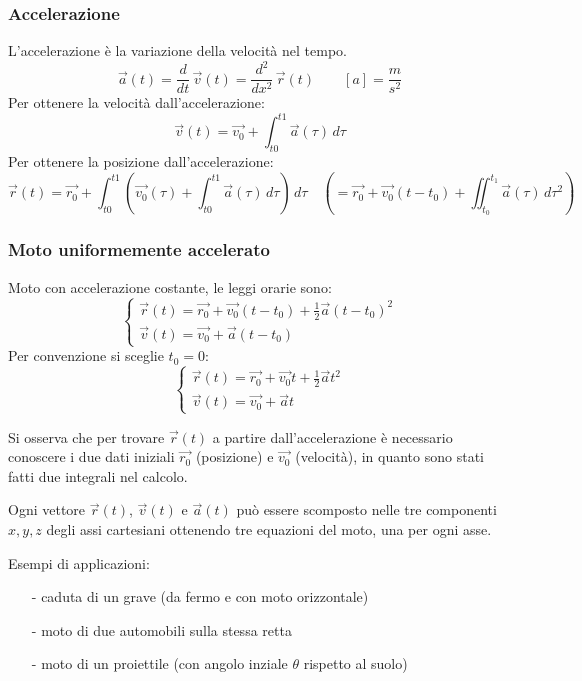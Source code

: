 \documentclass[a4paper]{article}
\newcommand\dt{\frac{d}{dt}\,}
\begin{document}
\subsubsection*{Accelerazione}
L'accelerazione è la variazione della velocità nel tempo. \[\vec{a}(t) = \dt \vec{v}(t) = \frac{d^2}{dx^2} \, \vec{r}(t) \qquad \left[a\right] = \frac{m}{s^2}\]
Per ottenere la velocità dall'accelerazione: \[\vec{v}(t) = \vec{v_0} + \int_{t0}^{t1} \vec{a}(\tau) \, d\tau\]
Per ottenere la posizione dall'accelerazione: \[\vec{r}(t) = \vec{r_0} + \int_{t0}^{t1} \left( \vec{v_0}(\tau) + \int_{t0}^{t1} \vec{a}(\tau) \, d\tau \right) \, d\tau \quad \left(= \vec{r_0} + \vec{v_0}(t-t_0) + \iint_{t_0}^{t_1} \vec{a}(\tau) \, d\tau^2 \right)\]

\subsubsection*{Moto uniformemente accelerato}
Moto con accelerazione costante, le leggi orarie sono:
\[ \begin{cases}
	\vec{r}(t) = \vec{r_0} + \vec{v_0}(t-t_0) + \frac{1}{2}\vec{a}(t-t_0)^2 \\
	\vec{v}(t) = \vec{v_0} + \vec{a}(t-t_0)
\end{cases} \]
Per convenzione si sceglie \(t_0 = 0\):
\[ \begin{cases}
	\vec{r}(t) = \vec{r_0} + \vec{v_0}t + \frac{1}{2}\vec{a}t^2 \\
	\vec{v}(t) = \vec{v_0} + \vec{a}t
\end{cases} \]

Si osserva che per trovare \(\vec{r}(t)\) a partire dall'accelerazione è necessario conoscere i due dati iniziali \(\vec{r_0}\)
(posizione) e \(\vec{v_0}\) (velocità), in quanto sono stati fatti due integrali nel calcolo.

Ogni vettore \(\vec{r}(t)\), \(\vec{v}(t)\) e \(\vec{a}(t)\) può essere scomposto nelle tre componenti \(x, y, z\) degli assi cartesiani
ottenendo tre equazioni del moto, una per ogni asse.

Esempi di applicazioni:
\begin{itemize}
	\item[-] caduta di un grave (da fermo e con moto orizzontale)
	\item[-] moto di due automobili sulla stessa retta
	\item[-] moto di un proiettile (con angolo inziale \(\theta\) rispetto al suolo)
\end{itemize}
\end{document}
